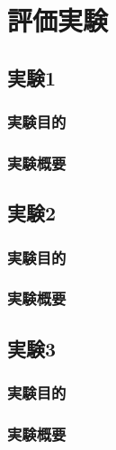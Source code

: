 \chapter{評価実験}

\section{実験1}

\subsection{実験目的}

\subsection{実験概要}

\section{実験2}

\subsection{実験目的}

\subsection{実験概要}

\section{実験3}

\subsection{実験目的}

\subsection{実験概要}
